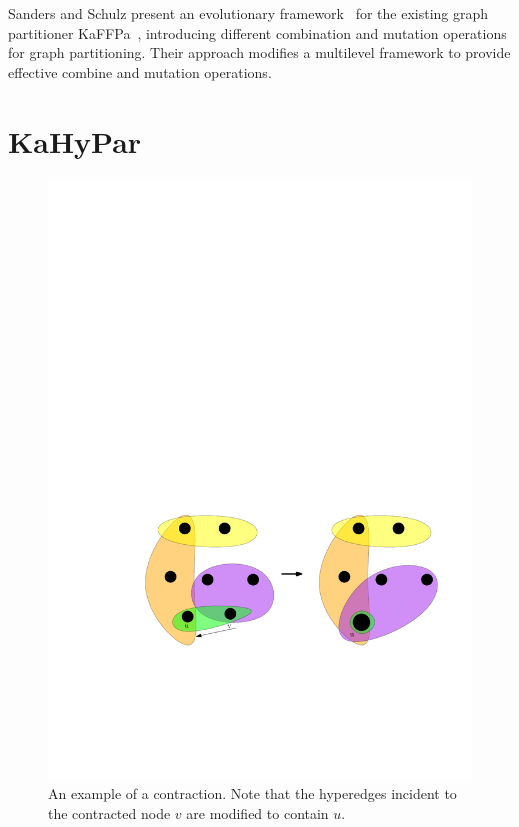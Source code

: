 \documentclass[a4paper,12pt,titlepage, BCOR7mm,headsepline]{scrbook}
\numberwithin{equation}{section}
\begin{document}

Sanders and Schulz present an evolutionary framework~\cite{sanders2012distributed} for the existing graph partitioner KaFFPa~\cite{holtgrewe2010engineering}, introducing different combination and mutation operations for graph partitioning.  Their approach modifies a multilevel
framework to provide effective combine and mutation operations.

\section{KaHyPar}
\begin{figure}[t!] 
    \vspace*{-.25cm}
  \centering
   \includegraphics[width=.8\textwidth]{Ipe/Coarsening_Example.pdf}
  \caption{An example of a contraction. Note that the hyperedges incident to the contracted node $v$ are modified to contain $u$.}\label{fig:coarsening_example}
    \vspace*{-.5cm}
\end{figure}
\end{document}
